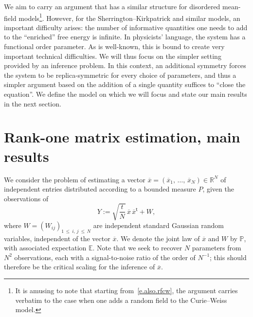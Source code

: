 \documentclass[10pt]{amsart}
\theoremstyle{definition}\newtheorem{defi}[theo]{Definition}\newtheorem{rema}[theo]{Remark}\newtheorem{exam}[theo]{Example}\newtheorem{exem}[theo]{Example}\newtheorem{nota}[theo]{Notation}
\newcommand{\R}{\mathbb{R}}
\newcommand{\E}{\mathbb{E}}
\renewcommand{\P}{\mathbb{P}}
\renewcommand{\t}{\mathsf{t}}
\newcommand{\1}{\mathds{1}}
\renewcommand{\le}{\leqslant}
\renewcommand{\bar}{\overline}
\begin{document}

We aim to carry an argument that has a similar structure for disordered mean-field models\footnote{It is amusing to note that starting from~\eqref{e.also.rfcw}, the argument carries verbatim to the case when one adds a random field to the Curie--Weiss model.}. However, for the Sherrington--Kirkpatrick and similar models, an important difficulty arises: the number of informative quantities one needs to add to the ``enriched'' free energy is infinite. In physicists' language, the system has a functional order parameter. As is well-known, this is bound to create very important technical difficulties. We will thus focus on the simpler setting provided by an inference problem. In this context, an additional symmetry forces the system to be replica-symmetric for every choice of parameters, and thus a simpler argument based on the addition of a single quantity suffices to ``close the equation''. We define the model on which we will focus and state our main results in the next section.


\section{Rank-one matrix estimation, main results}\label{s.results}

We consider the problem of estimating a vector $\bar x = (\bar x_1,\,\ldots,\,\bar x_N) \in \R^N$ of independent entries distributed according to a bounded measure $P$, given the observations of
\[
Y := \sqrt{\frac{t}{N}} \, \bar x \, \bar x^\t + W,
\]
where $W = (W_{ij})_{1\,\le\:i,\,j\:\le\,N}$ are independent standard Gaussian random variables, independent of the vector $\bar x$. We denote the joint law of $\bar x$ and $W$ by $\P$, with associated expectation $\E$. Note that we seek to recover $N$ parameters from $N^2$ observations, each with a signal-to-noise ratio of the order of $N^{-1}$; this should therefore be the critical scaling for the inference of $\bar x$.

\end{document}
